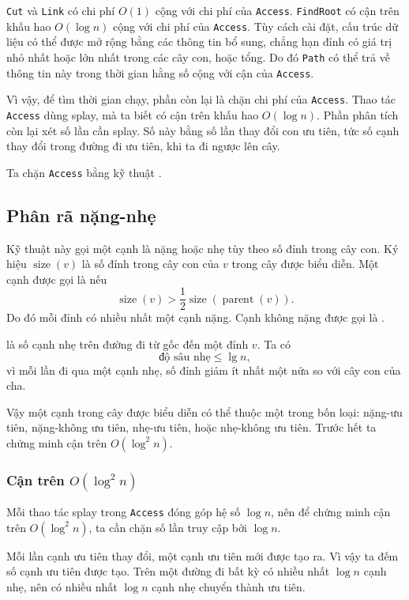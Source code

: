 \documentclass[11pt]{article}
\begin{document}
\texttt{Cut} và \texttt{Link} có chi phí $O(1)$ cộng với chi phí của
\texttt{Access}. \texttt{FindRoot} có cận trên khấu hao $O(\log n)$ cộng với
chi phí của \texttt{Access}. Tùy cách cài đặt, cấu trúc dữ liệu có thể được mở
rộng bằng các thông tin bổ sung, chẳng hạn đỉnh có giá trị nhỏ nhất hoặc lớn
nhất trong các cây con, hoặc tổng. Do đó \texttt{Path} có thể trả về thông tin
này trong thời gian hằng số cộng với cận của \texttt{Access}.

Vì vậy, để tìm thời gian chạy, phần còn lại là chặn chi phí của
\texttt{Access}. Thao tác \texttt{Access} dùng splay, mà ta biết có cận trên
khấu hao $O(\log n)$. Phần phân tích còn lại xét số lần cần splay. Số này bằng
số lần thay đổi con ưu tiên, tức số cạnh thay đổi trong đường đi ưu tiên, khi
ta đi ngược lên cây.

Ta chặn \texttt{Access} bằng kỹ thuật .

\subsection{Phân rã nặng-nhẹ}

Kỹ thuật này gọi một cạnh là nặng hoặc nhẹ tùy theo số đỉnh trong cây con. Ký
hiệu $\operatorname{size}(v)$ là số đỉnh trong cây con của $v$ trong cây được
biểu diễn. Một cạnh được gọi là  nếu
\[
  \operatorname{size}(v) > \frac{1}{2}
  \operatorname{size}(\operatorname{parent}(v)).
\]
Do đó mỗi đỉnh có nhiều nhất một cạnh nặng. Cạnh không nặng được gọi là
.

 là số cạnh nhẹ trên đường đi từ gốc đến một đỉnh $v$. Ta có
\[
  \text{độ sâu nhẹ} \le \lg n,
\]
vì mỗi lần đi qua một cạnh nhẹ, số đỉnh giảm ít nhất một nửa so với cây con của
cha.

Vậy một cạnh trong cây được biểu diễn có thể thuộc một trong bốn loại:
nặng-ưu tiên, nặng-không ưu tiên, nhẹ-ưu tiên, hoặc nhẹ-không ưu tiên. Trước
hết ta chứng minh cận trên $O(\log^2 n)$.

\subsubsection{\texorpdfstring{Cận trên $O(\log^2 n)$}{Cận trên O(log binh phuong n)}}

Mỗi thao tác splay trong \texttt{Access} đóng góp hệ số $\log n$, nên để chứng
minh cận trên $O(\log^2 n)$, ta cần chặn số lần truy cập bởi $\log n$.

Mỗi lần cạnh ưu tiên thay đổi, một cạnh ưu tiên mới được tạo ra. Vì vậy ta đếm
số cạnh ưu tiên được tạo. Trên một đường đi bất kỳ có nhiều nhất $\log n$ cạnh
nhẹ, nên có nhiều nhất $\log n$ cạnh nhẹ chuyển thành ưu tiên.
\end{document}

